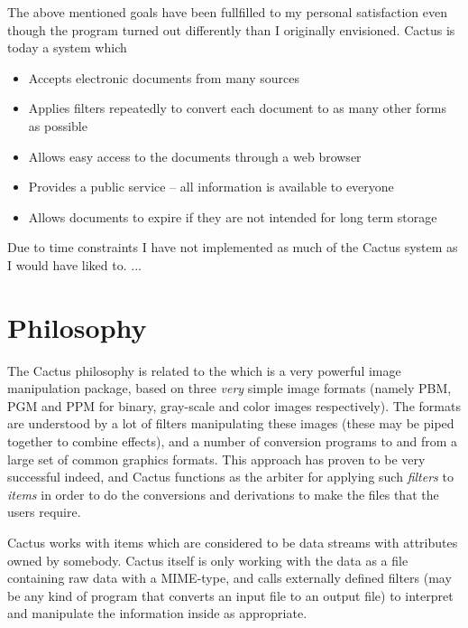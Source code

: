 The above mentioned goals have been fullfilled to my
personal satisfaction even though the program turned out
differently than I originally envisioned. Cactus is today a
system which

\begin{itemize}
  
\item Accepts electronic documents from many sources
  
\item Applies filters repeatedly to convert each document to
  as many other forms as possible
  
\item Allows easy access to the documents through a web
  browser
  
\item Provides a public service -- all information is
  available to everyone
  
\item Allows documents to expire if they are not intended
  for long term storage

\end{itemize}

Due to time constraints I have not implemented as much of
the Cactus system as I would have liked to.  \textsf{...}

\section{Philosophy}
\label{sec:cactus-philosophy}

The Cactus philosophy is related to the
 which is a very
powerful image manipulation package, based on three
\textit{very} simple image formats (namely PBM, PGM and PPM
for binary, gray-scale and color images respectively).  The
formats are understood by a lot of filters manipulating
these images (these may be piped together to combine
effects), and a number of conversion programs to and from a
large set of common graphics formats.  This approach has
proven to be very successful indeed, and Cactus functions as
the arbiter for applying such \textit{filters} to
\textit{items} in order to do the conversions and
derivations to make the files that the users require.

Cactus works with items which are considered to be data
streams with attributes owned by somebody.  Cactus itself is
only working with the data as a file containing raw data
with a MIME-type, and calls externally defined filters (may
be any kind of program that converts an input file to an
output file) to interpret and manipulate the information
inside as appropriate.

